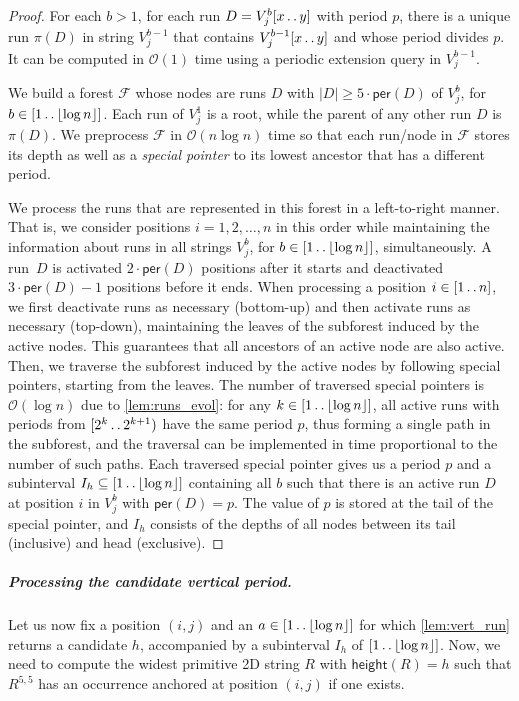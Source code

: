 \documentclass[11pt,letterpaper]{article}
\newcommand{\cO}{\mathcal{O}}
\newcommand{\floor}[1]{\left\lfloor #1 \right\rfloor}
\newcommand{\height}{\textsf{height}}
\def\dd{\mathinner{.\,.}}
\newcommand{\vmeta}[2]{V_{#1}^{#2}}
\newcommand{\per}{\textsf{per}}
\begin{document}
\begin{proof}
For each $b>1$, for each run $D=\vmeta{j}{b}[x \dd y]$ with period $p$, there is a unique run $\pi(D)$ in string $\vmeta{j}{b-1}$ that contains $\vmeta{j}{b-1}[x \dd y]$ and whose period divides $p$.
It can be computed in $\cO(1)$ time using a periodic extension query in $\vmeta{j}{b-1}$.

We build a forest $\mathcal{F}$ whose nodes are runs $D$ with $|D|\geq 5\cdot \per(D)$ of $\vmeta{j}{b}$, for $b \in [1 \dd \floor{\log n}]$.
Each run of $\vmeta{j}{1}$ is a root, while the parent of any other run $D$ is $\pi(D)$.
We preprocess $\mathcal{F}$ in $\cO(n\log n)$ time so that each run/node in $\mathcal{F}$ stores its depth as well as a \emph{special pointer} to its lowest ancestor that has a different period.

We process the runs that are represented in this forest in a left-to-right manner.
That is, we consider positions $i=1,2,\ldots,n$ in this order while maintaining the information about runs in all
strings $\vmeta{j}{b}$, for $b \in [1 \dd \floor{\log n}]$, simultaneously.
A run~$D$ is activated $2\cdot\per(D)$ positions after it starts and deactivated $3\cdot \per(D)-1$ positions before it ends.
When processing a position $i \in [1\dd n]$, we first deactivate runs as necessary (bottom-up) and then activate runs as necessary (top-down), maintaining the leaves of the subforest induced by the active nodes.
This guarantees that all ancestors of an active node are also active.
Then, we traverse the subforest induced by the active nodes by following special pointers, starting from the leaves.
The number of traversed special pointers is $\cO(\log n)$ due to \cref{lem:runs_evol}: for any $k\in [1 \dd \floor{\log n}]$,
all active runs with periods from $[2^{k}\dd 2^{k+1})$ have the same period $p$, thus forming a single path
in the subforest, and the traversal can be implemented in time proportional to the number of such paths.
Each traversed special pointer gives us a period $p$ and a subinterval $I_h \subseteq [1 \dd \floor{\log n}]$ containing all $b$
such that there is an active run $D$ at position $i$ in $\vmeta{j}{b}$ with $\per(D)=p$.
The value of $p$ is stored at the tail of the special pointer, and $I_{h}$ consists of the depths of all nodes between
its tail (inclusive) and head (exclusive).
\end{proof}

\subparagraph{Processing the candidate vertical period.}
Let us now fix a position $(i,j)$ and an $a \in [1 \dd \floor{\log n}]$ for which \cref{lem:vert_run} returns a candidate $h$, accompanied by a subinterval $I_h$ of $[1 \dd \floor{\log n}]$.
Now, we need to compute the widest primitive 2D string $R$ with $\height(R)=h$ such that $R^{5,5}$ has an occurrence anchored at position $(i,j)$ if one exists.
\end{document}
